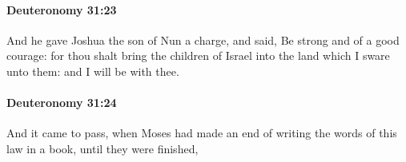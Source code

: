 		\paragraph{Deuteronomy 31:23} %
			\label{DEUTERONOMY-31-23}

			And he gave Joshua the son of Nun a charge, and said, Be strong and of a good courage: for thou shalt bring the children of Israel into the land which I sware unto them: and I will be with thee.


		\paragraph{Deuteronomy 31:24} %
			\label{DEUTERONOMY-31-24}

			And it came to pass, when Moses had made an end of writing the words of this law in a book, until they were finished,


